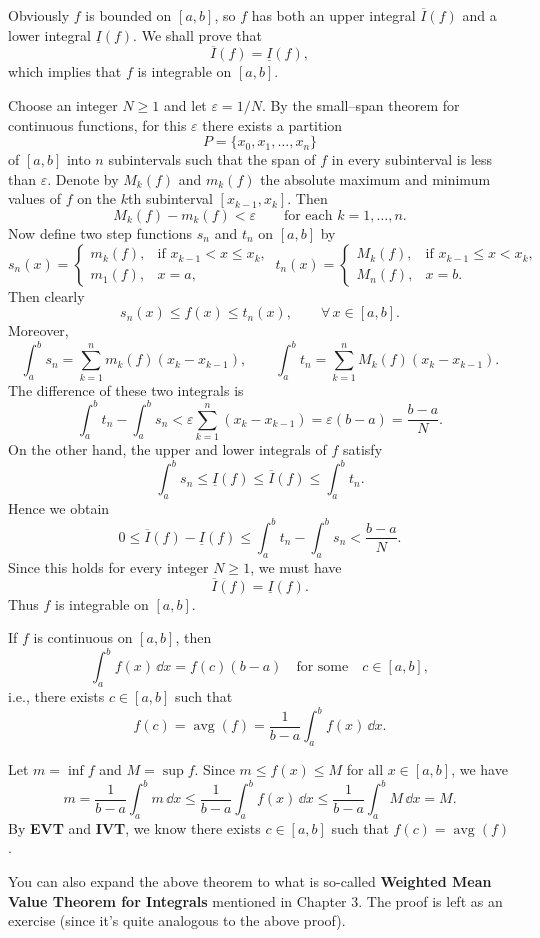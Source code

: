 	\begin{proofenv}
	Obviously $f$ is bounded on $[a,b]$, so $f$ has both an upper integral $\overline{I}(f)$ and a lower integral $\underline{I}(f)$. We shall prove that
	\[
	\overline{I}(f)=\underline{I}(f),
	\]
	which implies that $f$ is integrable on $[a,b]$.

	Choose an integer $N\ge 1$ and let $\varepsilon=1/N$. By the small--span theorem for continuous functions, for this $\varepsilon$ there exists a partition
	\[
	P=\{x_0, x_1,\dots,x_n\}
	\]
	of $[a,b]$ into $n$ subintervals such that the span of $f$ in every subinterval	is less than $\varepsilon$. Denote by $M_k(f)$ and $m_k(f)$ the absolute maximum
	and minimum values of $f$ on the $k$th subinterval $[x_{k-1},x_k]$. Then
	\[
	M_k(f)-m_k(f) < \varepsilon
	\qquad \text{for each } k=1,\dots,n.
	\]
	Now define two step functions $s_n$ and $t_n$ on $[a,b]$ by
	\[
	s_n(x)=
	\begin{cases}
	m_k(f), & \text{if } x_{k-1}<x\le x_k,\\[4pt]
	m_1(f), & x=a,
	\end{cases}
	\ 
	t_n(x)=
	\begin{cases}
	M_k(f), & \text{if } x_{k-1}\le x < x_k,\\[4pt]
	M_n(f), & x=b.
	\end{cases}
	\]
	Then clearly
	\[
	s_n(x)\le f(x)\le t_n(x), \qquad \forall\, x\in[a,b].
	\]
	Moreover,
	\[
	\int_a^b s_n
	= \sum_{k=1}^n m_k(f)(x_k-x_{k-1}), 
	\qquad
	\int_a^b t_n
	= \sum_{k=1}^n M_k(f)(x_k-x_{k-1}).
	\]
	The difference of these two integrals is
	\[
	\int_a^b t_n - \int_a^b s_n
	< \varepsilon \sum_{k=1}^n (x_k-x_{k-1})
	= \varepsilon(b-a)
	= \frac{b-a}{N}.
	\]
	On the other hand, the upper and lower integrals of $f$ satisfy
	\[
	\int_a^b s_n \le \underline{I}(f) \le \overline{I}(f) 
	\le \int_a^b t_n.
	\]
	Hence we obtain
	\[
	0 \le \overline{I}(f) - \underline{I}(f)
	\le \int_a^b t_n - \int_a^b s_n
	< \frac{b-a}{N}.
	\]
	Since this holds for every integer $N\ge 1$, we must have
	\[
	\overline{I}(f)=\underline{I}(f).
	\]
	Thus $f$ is integrable on $[a,b]$.
	\end{proofenv}
	\begin{theoremenv}
		If $f$ is continuous on $[a,b]$, then
		\[
		\int_a^b f(x)\, \dd x= f(c)(b-a) \quad \text{for some}\quad c\in [a,b],
		\]
		i.e., there exists $c\in [a,b]$ such that
		\[
		f(c)=\operatorname{avg}(f)=\frac{1}{b-a}\int_a^b f(x)\, \dd x.
		\]
	\end{theoremenv}
	\begin{proofenv}
		Let $m=\inf f$ and $M=\sup f$. Since $m\le f(x) \le M$ for all $x\in [a,b]$, we have
		\[
		m=\frac{1}{b-a}\int_a^b m\, \dd x \le \frac{1}{b-a}\int_a^b f(x)\, \dd x \le \frac{1}{b-a}\int_a^b M\, \dd x = M.
		\]
		By \textbf{EVT} and \textbf{IVT}, we know there exists $c\in [a,b]$ such that $f(c)=\operatorname{avg}(f)$.
	\end{proofenv}
    \begin{remarkenv}
        You can also expand the above theorem to what is so-called \textbf{Weighted Mean Value Theorem for Integrals} mentioned in Chapter 3. The proof is left as an exercise (since it's quite analogous to the above proof).
    \end{remarkenv}
	\newpage